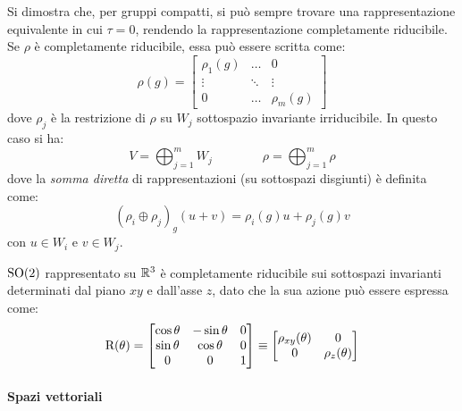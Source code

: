 Si dimostra che, per gruppi compatti, si può sempre trovare una rappresentazione equivalente in cui $ \tau = 0 $, rendendo la rappresentazione completamente riducibile.\\
Se $ \rho $ è completamente riducibile, essa può essere scritta come:
\begin{equation}
	\rho(g) =
	\begin{bmatrix}
		\rho_1(g) & \dots & 0 \\
		\vdots & \ddots & \vdots \\
		0 & \dots & \rho_m(g)
	\end{bmatrix}
	\label{eq:8.3}
\end{equation}
dove $ \rho_j $ è la restrizione di $ \rho $ su $ W_j $ sottospazio invariante irriducibile. In questo caso si ha:
\begin{equation}
	V = \bigoplus_{j = 1}^{m} W_j
	\qquad \qquad
	\rho = \bigoplus_{j = 1}^{m} \rho
	\label{eq:8.4}
\end{equation}
dove la \textit{somma diretta} di rappresentazioni (su sottospazi disgiunti) è definita come:
\begin{equation}
	(\rho_i \oplus \rho_j)_g (u + v) = \rho_i(g) u + \rho_j(g) v
	\label{eq:8.5}
\end{equation}
con $ u \in W_i $ e $ v \in W_j $.

\begin{example}
	$ \mathrm{SO}(2) $ rappresentato su $ \mathbb{R}^3 $ è completamente riducibile sui sottospazi invarianti determinati dal piano $ xy $ e dall'asse $ z $, dato che la sua azione può essere espressa come:
	\begin{equation}
		\mathrm{R}(\theta) =
		\begin{bmatrix}
			\cos \theta & - \sin \theta & 0 \\
			\sin \theta & \cos \theta & 0 \\
			0 & 0 & 1
		\end{bmatrix}
		\equiv
		\begin{bmatrix}
			\rho_{xy}(\theta) & 0 \\
			0 & \rho_z(\theta)
		\end{bmatrix}
	\end{equation}
\end{example}

\paragraph{Spazi vettoriali}

